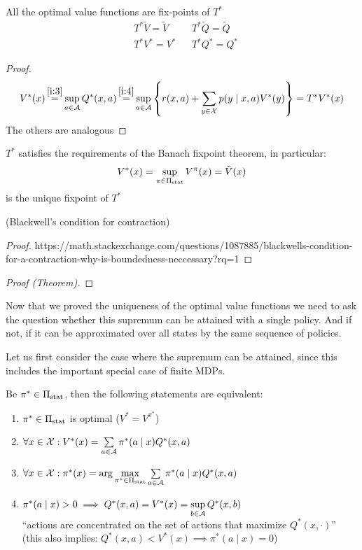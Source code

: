 \begin{corollary} All the optimal value functions are fix-points of \(T^*\)
	\begin{align*}
	&T^*\tilde{V}=\tilde{V}  && T^*\tilde{Q}=\tilde{Q}\\
	&T^*V^*=V^* && T^*Q^*=Q^*
	\end{align*}
\end{corollary}

\begin{proof}
\begin{align*}
	V^*(x)\xeq{\ref{i:3}}\sup_{a\in\cA}Q^*(x,a)\xeq{\ref{i:4}}\sup_{a\in\cA}\left\{r(x,a)+\sum_{y\in\cX}p(y\mid x,a) V^*(y)\right\} =T^*V^*(x)
\end{align*}
The others are analogous
\end{proof}


\begin{thm}
\(T^*\) satisfies the requirements of the Banach fixpoint theorem, in particular:
	\[V^*(x)=\sup_{\pi\in\Pi_{\textnormal{stat}}}V^\pi(x)=\tilde{V}(x) \]
is the unique fixpoint of \(T^*\)
\end{thm}

\begin{lemma}(Blackwell's condition for contraction)
\end{lemma}

\begin{proof}
https://math.stackexchange.com/questions/1087885/blackwells-condition-for-a-contraction-why-is-boundedness-neccessary?rq=1
\end{proof}

\begin{proof}[Proof (Theorem)]
\end{proof}

Now that we proved the uniqueness of the optimal value functions we need to ask the question whether this supremum can be attained with a single policy. And if not, if it can be approximated over all states by the same sequence of policies. 

Let us first consider the case where the supremum can be attained, since this includes the important special case of finite MDPs.  

\begin{prop}\label{sup is attained}Be \(\pi^*\in\Pi_{\textnormal{stat}}\), then the following statements are equivalent:
\begin{enumerate}[label={(\roman*)},font=\normalfont]
\item \(\pi^* \in\Pi_{\textnormal{stat}}\) is optimal (\(V^*=V^{\pi^*}\))
\item \(\forall x\in\mathcal{X}: V^*(x)=\sum\limits_{a\in\mathcal{A}}\pi^*(a\mid x)Q^*(x,a)\)
\item\label{ii:3} \(\forall x\in\mathcal{X}: \pi^*(x)=\arg\max\limits_{\pi^*\in\Pi_{\textnormal{stat}}}\sum\limits_{a\in\mathcal{A}}\pi^*(a\mid x)Q^*(x,a) \)
\item \(\pi^*(a\mid x)>0 \implies Q^*(x,a)=V^*(x) =\sup\limits_{b\in\mathcal{A}}Q^*(x,b)\) \\
	``actions are concentrated on the set of actions that maximize \(Q^*(x,\cdot)\)''\\
	(this also implies: \(Q^*(x,a)<V^*(x) \implies \pi^*(a\mid x)=0\))
\end{enumerate}
\end{prop}

